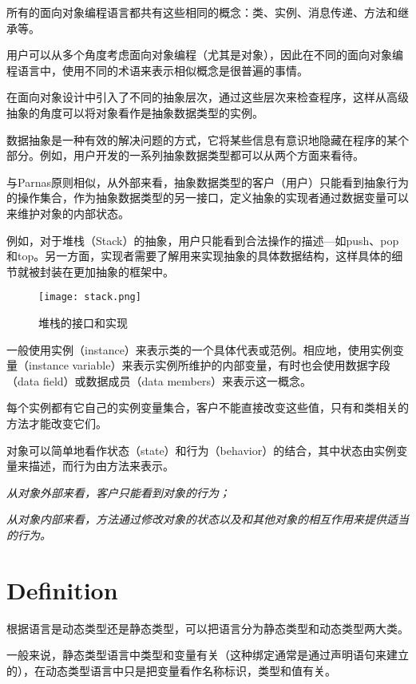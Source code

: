 所有的面向对象编程语言都共有这些相同的概念：类、实例、消息传递、方法和继承等。


用户可以从多个角度考虑面向对象编程（尤其是对象），因此在不同的面向对象编程语言中，使用不同的术语来表示相似概念是很普遍的事情。

在面向对象设计中引入了不同的抽象层次，通过这些层次来检查程序，这样从高级抽象的角度可以将对象看作是抽象数据类型的实例。

数据抽象是一种有效的解决问题的方式，它将某些信息有意识地隐藏在程序的某个部分。例如，用户开发的一系列抽象数据类型都可以从两个方面来看待。

与Parnas原则相似，从外部来看，抽象数据类型的客户（用户）只能看到抽象行为的操作集合，作为抽象数据类型的另一接口，定义抽象的实现者通过数据变量可以来维护对象的内部状态。

例如，对于堆栈（Stack）的抽象，用户只能看到合法操作的描述—如push、pop和top。另一方面，实现者需要了解用来实现抽象的具体数据结构，这样具体的细节就被封装在更加抽象的框架中。

\begin{figure}[htbp]
\centering
\texttt{[image: stack.png]}
\caption{堆栈的接口和实现}
\label{fig:stack}
\end{figure}

一般使用实例（instance）来表示类的一个具体代表或范例。相应地，使用实例变量（instance variable）来表示实例所维护的内部变量，有时也会使用数据字段（data field）或数据成员（data members）来表示这一概念。

每个实例都有它自己的实例变量集合，客户不能直接改变这些值，只有和类相关的方法才能改变它们。

对象可以简单地看作状态（state）和行为（behavior）的结合，其中状态由实例变量来描述，而行为由方法来表示。

\begin{compactitem}
\item \textsl{从对象外部来看，客户只能看到对象的行为；}
\item \textsl{从对象内部来看，方法通过修改对象的状态以及和其他对象的相互作用来提供适当的行为。}
\end{compactitem}


\chapter{Definition}

根据语言是动态类型还是静态类型，可以把语言分为静态类型和动态类型两大类。

一般来说，静态类型语言中类型和变量有关（这种绑定通常是通过声明语句来建立的），在动态类型语言中只是把变量看作名称标识，类型和值有关。

